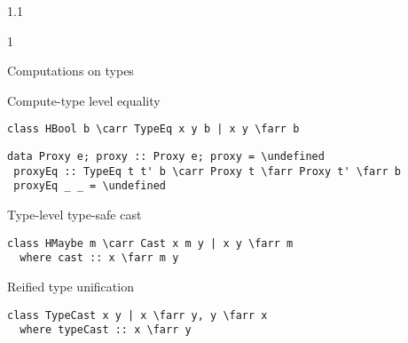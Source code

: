 \documentclass{slides}
\newenvironment{myslide}{\begin{slide}\color{Blue}\begin{boxedminipage}{1.1\hsize}\begin{boxedminipage}{1\hsize}\color{Black}
\vspace{-170\in}
}{%
\smallskip
\end{boxedminipage}
\end{boxedminipage}
\end{slide}}
\newenvironment{myslide}{\begin{slide}
}{%
\end{slide}}
\newenvironment{myslide}{\begin{slide}\color{White}\begin{boxedminipage}{1.1\hsize}\color{Black}
\vspace{-170\in}
}{%
\smallskip
\end{boxedminipage}
\end{slide}}
\newcommand{\header}[1]{{\large \color{Red} #1}}
\newcommand{\blau}[1]{{\vspace{-50\in}\normalsize \color{Blue} #1}}
\newcommand{\undefined}{\ensuremath{\bot}}
\newcommand{\farr}{\ensuremath{\to}}
\newcommand{\carr}{\ensuremath{\Rightarrow}}
\begin{document}



\begin{myslide}

\header{Computations on types}

\vspace{-77\in}

\blau{Compute-type level equality}

\smallskip

\begin{Verbatim}[fontfamily=courier,fontsize=\small,commandchars=\\\{\}]
 class HBool b \carr TypeEq x y b | x y \farr b
\end{Verbatim}

\smallskip

\begin{Verbatim}[fontfamily=courier,fontsize=\tiny,commandchars=\\\{\}]
 data Proxy e; proxy :: Proxy e; proxy = \undefined
 proxyEq :: TypeEq t t' b \carr Proxy t \farr Proxy t' \farr b
 proxyEq _ _ = \undefined
\end{Verbatim}

\vspace{-77\in}

\blau{Type-level type-safe cast}

\smallskip

\begin{Verbatim}[fontfamily=courier,fontsize=\small,commandchars=\\\{\}]
 class HMaybe m \carr Cast x m y | x y \farr m
  where cast :: x \farr m y
\end{Verbatim}

\vspace{-77\in}

\blau{Reified type unification}

\smallskip

\begin{Verbatim}[fontfamily=courier,fontsize=\small,commandchars=\\\{\}]
 class TypeCast x y | x \farr y, y \farr x
  where typeCast :: x \farr y
\end{Verbatim}

\end{myslide}



\end{document}
